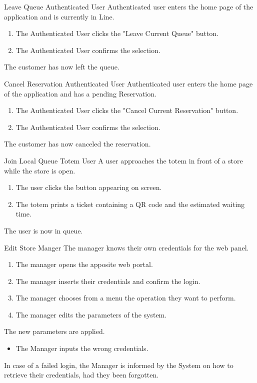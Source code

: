 \usecase
{Leave Queue}
{Authenticated User}
{Authenticated user enters the home page of the application and is currently in Line.}
{
    \begin{enumerate}
        \item The Authenticated User clicks the "Leave Current Queue" button.
        \item The Authenticated User confirms the selection.
    \end{enumerate}
}
{
    The customer has now left the queue.
}
{}
{}

\usecase
{Cancel Reservation}
{Authenticated User}
{Authenticated user enters the home page of the application and has a pending Reservation.}
{
    \begin{enumerate}
        \item The Authenticated User clicks the "Cancel Current Reservation" button.
        \item The Authenticated User confirms the selection.
    \end{enumerate}
}
{
    The customer has now canceled the reservation.
}
{}
{}

\usecase
{Join Local Queue}
{Totem User}
{A user approaches the totem in front of a store while the store is open.}
{
    \begin{enumerate}
        \item The user clicks the button appearing on screen.
        \item The totem prints a ticket containing a QR code and the estimated waiting time.
    \end{enumerate}
}
{
    The user is now in queue.
}
{}
{}

\usecase
{Edit Store}
{Manger}
{The manager knows their own credentials for the web panel.}
{
    \begin{enumerate}
        \item The manager opens the apposite web portal.
        \item The manager inserts their credentials and confirm the login.
        \item The manager chooses from a menu the operation they want to perform.
        \item The manager edits the parameters of the system.
    \end{enumerate}
}
{
    The new parameters are applied.
}
{
    \begin{itemize}
        \item The Manager inputs the wrong credentials.
    \end{itemize}
}
{
    In case of a failed login, the Manager is informed by the System on how to retrieve their credentials, had they been forgotten.
}

